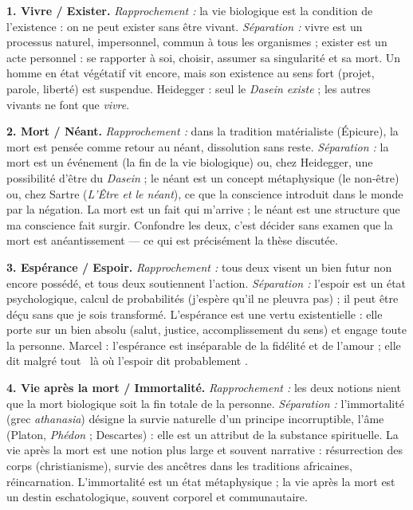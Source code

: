 \documentclass[11pt]{article}
\begin{document}
\begin{corrige}
\textbf{1. Vivre / Exister.} \emph{Rapprochement :} la vie biologique est la condition de l'existence : on ne peut exister sans être vivant. \emph{Séparation :} vivre est un processus naturel, impersonnel, commun à tous les organismes ; exister est un acte personnel : se rapporter à soi, choisir, assumer sa singularité et sa mort. Un homme en état végétatif vit encore, mais son existence au sens fort (projet, parole, liberté) est suspendue. Heidegger : seul le \emph{Dasein} \emph{existe} ; les autres vivants ne font que \emph{vivre}.

\textbf{2. Mort / Néant.} \emph{Rapprochement :} dans la tradition matérialiste (Épicure), la mort est pensée comme retour au néant, dissolution sans reste. \emph{Séparation :} la mort est un événement (la fin de la vie biologique) ou, chez Heidegger, une possibilité d'être du \emph{Dasein} ; le néant est un concept métaphysique (le non-être) ou, chez Sartre (\emph{L'Être et le néant}), ce que la conscience introduit dans le monde par la négation. La mort est un fait qui m'arrive ; le néant est une structure que ma conscience fait surgir. Confondre les deux, c'est décider sans examen que la mort est anéantissement — ce qui est précisément la thèse discutée.

\textbf{3. Espérance / Espoir.} \emph{Rapprochement :} tous deux visent un bien futur non encore possédé, et tous deux soutiennent l'action. \emph{Séparation :} l'espoir est un état psychologique, calcul de probabilités (j'espère qu'il ne pleuvra pas) ; il peut être déçu sans que je sois transformé. L'espérance est une vertu existentielle : elle porte sur un bien absolu (salut, justice, accomplissement du sens) et engage toute la personne. Marcel : l'espérance est inséparable de la fidélité et de l'amour ; elle dit \guillemotleft malgré tout \guillemotright\ là où l'espoir dit \guillemotleft probablement \guillemotright.

\textbf{4. Vie après la mort / Immortalité.} \emph{Rapprochement :} les deux notions nient que la mort biologique soit la fin totale de la personne. \emph{Séparation :} l'immortalité (grec \emph{athanasia}) désigne la survie naturelle d'un principe incorruptible, l'âme (Platon, \emph{Phédon} ; Descartes) : elle est un attribut de la substance spirituelle. La vie après la mort est une notion plus large et souvent narrative : résurrection des corps (christianisme), survie des ancêtres dans les traditions africaines, réincarnation. L'immortalité est un état métaphysique ; la vie après la mort est un destin eschatologique, souvent corporel et communautaire.
\end{corrige}
\end{document}
